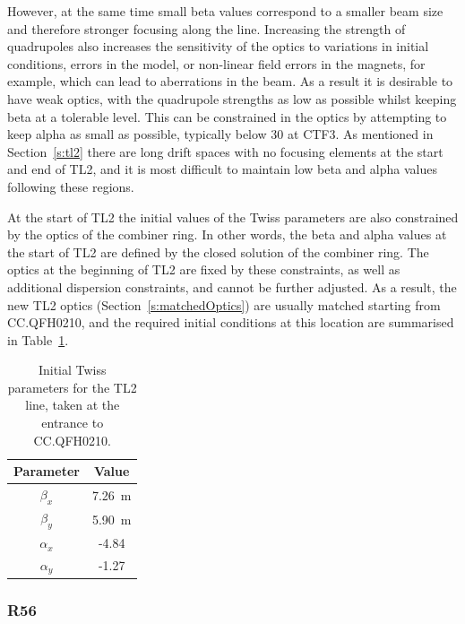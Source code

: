 However, at the same time small beta values correspond to a smaller beam size and therefore stronger focusing along the line. Increasing the strength of quadrupoles also increases the sensitivity of the optics to variations in initial conditions, errors in the model, or non-linear field errors in the magnets, for example, which can lead to aberrations in the beam. As a result it is desirable to have weak optics, with the quadrupole strengths as low as possible whilst keeping beta at a tolerable level. This can be constrained in the optics by attempting to keep alpha as small as possible, typically below 30 at CTF3. As mentioned in Section~\ref{s:tl2} there are long drift spaces with no focusing elements at the start and end of TL2, and it is most difficult to maintain low beta and alpha values following these regions. 

At the start of TL2 the initial values of the Twiss parameters are also constrained by the optics of the combiner ring. In other words, the beta and alpha values at the start of TL2 are defined by the closed solution of the combiner ring. The optics at the beginning of TL2 are fixed by these constraints, as well as additional dispersion constraints, and cannot be further adjusted. As a result, the new TL2 optics (Section~\ref{s:matchedOptics}) are usually matched starting from CC.QFH0210, and the required initial conditions at this location are summarised in Table~\ref{t:tl2InitTwiss}.

\begin{table}
  \begin{center}
    \begin{tabular}{|c c|}
	   \hline
       Parameter & Value \\
       \hline
       \(\beta_x\) & 7.26~m\\
	   \(\beta_y\) & 5.90~m\\
	   \(\alpha_x\) & -4.84\\
	   \(\alpha_y\) & -1.27\\
	   \hline
    \end{tabular}
    \caption{Initial Twiss parameters for the TL2 line, taken at the entrance to CC.QFH0210.}
  	\label{t:tl2InitTwiss}
  \end{center}
\end{table}

\subsubsection{R56}


